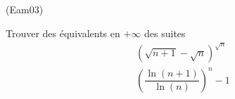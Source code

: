 \begin{tiny}(Eam03)\end{tiny}
Trouver des équivalents en $+\infty$ des suites
\begin{align*}
 \left(\sqrt{n+1}-\sqrt{n} \right)^{\sqrt{n}} \\
\left(\dfrac{\ln(n+1)}{\ln (n)} \right)^n -1 
\end{align*}

